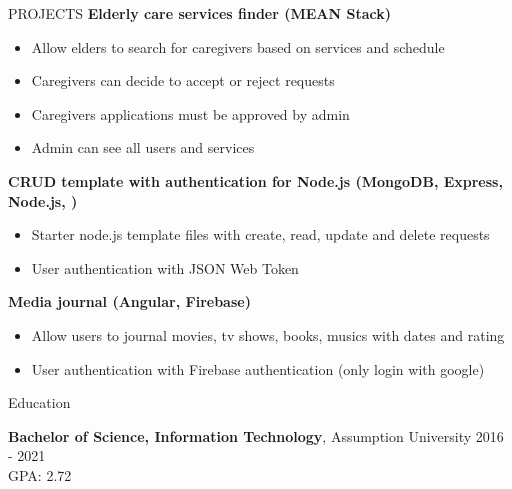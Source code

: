 \documentclass{resume}
\begin{document}
\begin{rSection}{PROJECTS}
\textbf{Elderly care services finder (MEAN Stack)} \hfill
 \begin{itemize}
    \itemsep -4pt {} 
        \item Allow elders to search for caregivers based on services and schedule
        \item Caregivers can decide to accept or reject requests
        \item Caregivers applications must be approved by admin
        \item Admin can see all users and services
 \end{itemize}

\textbf{CRUD template with authentication for Node.js (MongoDB, Express, Node.js, )} \hfill
 \begin{itemize}
    \itemsep -2pt {} 
        \item Starter node.js template files with create, read, update and delete requests
        \item User authentication with JSON Web Token
 \end{itemize}

 \textbf{Media journal (Angular, Firebase)} \hfill
 \begin{itemize}
    \itemsep -2pt {} 
        \item Allow users to journal movies, tv shows, books, musics with dates and rating 
        \item User authentication with Firebase authentication (only login with google)
 \end{itemize}

\end{rSection} 


\begin{rSection}{Education}

{\bf Bachelor of Science, Information Technology}, Assumption 
University \hfill {2016 - 2021}\\
GPA: 2.72

\end{rSection}
\end{document}

